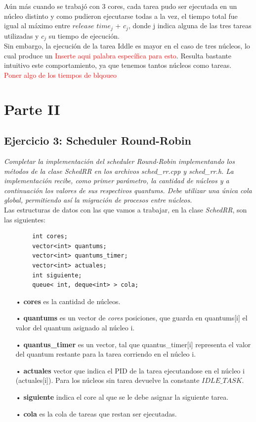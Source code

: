 \documentclass[a4paper]{article}
\begin{document}
Aún más cuando se trabajó con 3 cores, cada tarea pudo ser ejecutada en un núcleo distinto y como pudieron ejecutarse todas a la vez, el tiempo total fue igual al máximo entre $release$ $time_j$ + $c_j$, donde j indica alguna de las tres tareas utilizadas y $c_j$ su tiempo de ejecución.   \\

Sin embargo, la ejecuci\'on de la tarea Iddle es mayor en el caso de tres n\'ucleos, lo cual produce un \textcolor{red}{Inserte aqui palabra espec\'ifica para esto}. Resulta bastante intuitivo este comportamiento, ya que tenemos tantos n\'ucleos como tareas.\\

\textcolor{red}{Poner algo de los tiempos de blqoueo}
\newpage

\section{Parte II}


\subsection{Ejercicio 3: Scheduler Round-Robin}\label{RoundR}

\textit{Completar la implementaci\'on del scheduler Round-Robin implementando los m\'etodos de la clase SchedRR en los archivos sched_rr.cpp y sched_rr.h. La implementaci\'on recibe, como primer par\'ametro, la cantidad de n\'ucleos y a continuaci\'on los valores de sus respectivos quantums. Debe utilizar una \'unica cola global, permitiendo as\'i la migraci\'on de procesos entre n\'ucleos.}\\


Las estructuras de datos con las que vamos a trabajar, en la clase \emph{SchedRR}, son las siguientes:
	\begin{codesnippet}
	\begin{verbatim}
		int cores;
		vector<int> quantums;
		vector<int> quantums_timer;
		vector<int> actuales;
		int siguiente;
		queue< int, deque<int> > cola;
	\end{verbatim}
	\end{codesnippet}
	
	\begin{itemize}
	\item[•]\textbf{cores} es la cantidad de n\'ucleos.
	\item[•]\textbf{quantums} es un vector de \textit{cores} posiciones, que guarda en quantums[i] el valor del quantum asignado al n\'ucleo i.
	\item[•]\textbf{quantus_timer} es un vector, tal que quantus_timer[i] representa el valor del quantum restante para la tarea corriendo en el n\'ucleo i.
	\item[•]\textbf{actuales} vector que indica el PID de la tarea ejecutandose en el núcleo i (actuales[i]). Para los núcleos sin tarea devuelve la constante $IDLE\_TASK$.
	\item[•]\textbf{siguiente} indica el core al que se le debe asignar la siguiente tarea.
	\item[•]\textbf{cola} es la cola de tareas que restan ser ejecutadas.
	\end{itemize}	
	
\end{document}
